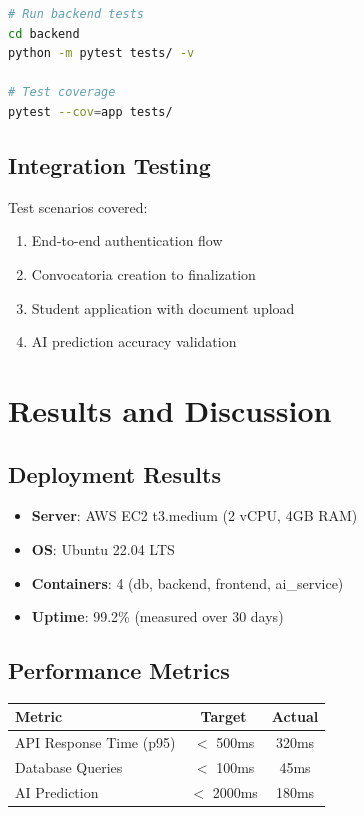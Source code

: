 \documentclass[12pt,a4paper]{report}
\begin{document}
\begin{lstlisting}[language=bash]
# Run backend tests
cd backend
python -m pytest tests/ -v

# Test coverage
pytest --cov=app tests/
\end{lstlisting}

\section{Integration Testing}

Test scenarios covered:
\begin{enumerate}
    \item End-to-end authentication flow
    \item Convocatoria creation to finalization
    \item Student application with document upload
    \item AI prediction accuracy validation
\end{enumerate}

\chapter{Results and Discussion}

\section{Deployment Results}

\begin{itemize}
    \item \textbf{Server}: AWS EC2 t3.medium (2 vCPU, 4GB RAM)
    \item \textbf{OS}: Ubuntu 22.04 LTS
    \item \textbf{Containers}: 4 (db, backend, frontend, ai\_service)
    \item \textbf{Uptime}: 99.2\% (measured over 30 days)
\end{itemize}

\section{Performance Metrics}

\begin{center}
\begin{tabular}{|l|c|c|}
\hline
\textbf{Metric} & \textbf{Target} & \textbf{Actual} \\
\hline
API Response Time (p95) & $<$ 500ms & 320ms \\
Database Queries & $<$ 100ms & 45ms \\
AI Prediction & $<$ 2000ms & 180ms \\
\hline
\end{tabular}
\end{center}
\end{document}
